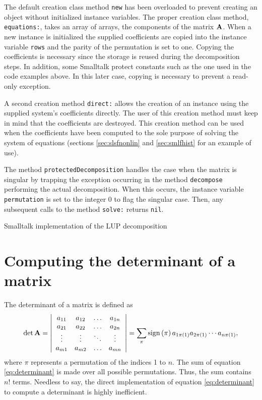 \documentclass[twoside]{book}
\begin{document}
The default creation class method {\tt new} has been overloaded to
prevent creating an object without initialized instance variables.
The proper creation class method, {\tt equations:}, takes an array
of arrays, the components of the matrix ${\bf A}$. When a new
instance is initialized the supplied coefficients are copied into
the instance variable {\tt rows} and the parity of the permutation
is set to one. Copying the coefficients is necessary since the
storage is reused during the decomposition steps. In addition,
some Smalltalk protect constants such as the one used in the code
examples above. In this later case, copying is necessary to
prevent a read-only exception.

A second creation method {\tt direct:} allows the creation of an
instance using the supplied system's coefficients directly. The
user of this creation method must keep in mind that the
coefficients are destroyed. This creation method can be used when
the coefficients have been computed to the sole purpose of solving
the system of equations (\cf sections \ref{sec:slsfnonlin} and
\ref{sec:smlfhist} for an example of use).

The method {\tt protectedDecomposition} handles the case when the
matrix is singular by trapping the exception occurring in the
method {\tt decompose} performing the actual decomposition. When
this occurs, the instance variable {\tt permutation} is set to the
integer 0 to flag the singular case. Then, any subsequent calls to
the method {\tt solve:} returns {\tt nil}.

\begin{listing} Smalltalk implementation of the LUP decomposition
\label{ls:lup}

\end{listing}


\section{Computing the determinant of a matrix}
\label{sec:determinant} The determinant of a matrix is defined
as
\begin{equation}
\label{eq:determinant}
  \det{\bf A}=\left|
  \begin{array}{cccc}a_{11}& a_{12}&\ldots& a_{1n}\\
  a_{21}& a_{22}&\ldots& a_{2n}\\
  \vdots&\vdots&\ddots&\vdots\\
  a_{m1}& a_{m2}&\ldots& a_{mn}\\ \end{array}
  \right|=\sum_{\pi}\mathop{\rm sign}\left({\pi}\right) a_{1\pi\left(1\right)}a_{2\pi\left(1\right)}
  \cdots a_{n\pi\left(1\right)},
\end{equation}
where $\pi$ represents a permutation of the indices 1 to $n$. The
sum of equation \ref{eq:determinant} is made over all possible
permutations. Thus, the sum contains $n!$ terms. Needless to say,
the direct implementation of equation \ref{eq:determinant} to
compute a determinant is highly inefficient.
\end{document}
